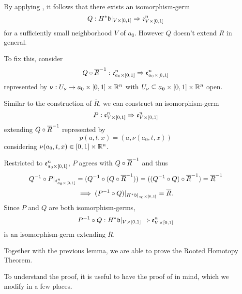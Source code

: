 \begin{myproof}
    By applying ,
    it follows that there exists an isomorphism-germ
    \[ Q: H^*\mathfrak{b}\vert_{V \times{} [0, 1]} \Rightarrow{} \mathfrak{e}^{n}_{V \times{} [0, 1]} \]
    for a sufficiently small neighborhood $V$ of $a_0$.
    However $Q$ doesn't extend $R$ in general.

    To fix this, consider
    \[ Q \circ \overline{R}^{-1}: \mathfrak{e}^{n}_{a_0 \times{} [0, 1]} \Rightarrow{} \mathfrak{e}^{n}_{a_0 \times{} [0, 1]} \]
    represented by $\nu: U_\nu \to a_0 \times{} [0, 1] \times \mathbb{R}^n$
    with $U_\nu \subseteq{} a_0 \times{} [0, 1] \times \mathbb{R}^n$ open.

    Similar to the construction of $\overline{R}$, we can construct an isomorphism-germ
    \[ P: \mathfrak{e}^{n}_{V \times{} [0, 1]} \Rightarrow{} \mathfrak{e}^{n}_{V \times{} [0, 1]} \]
    extending $Q \circ \overline{R}^{-1}$ represented by
    \[ p(a, t, x) = (a, \nu(a_0, t, x)) \]
    considering $\nu(a_0, t, x) \in [0, 1] \times \mathbb{R}^n$.

    Restricted to $\mathfrak{e}^{n}_{a_0 \times{} [0, 1]}$, $P$ agrees with $Q \circ \overline{R}^{-1}$ and thus
    \[
        Q^{-1} \circ P\vert_{\mathfrak{e}^{n}_{a_0 \times{} [0, 1]}}
        = (Q^{-1} \circ (Q \circ \overline{R}^{-1}))
        = ((Q^{-1} \circ Q) \circ \overline{R}^{-1})
        = \overline{R}^{-1}
    \]
    \[ \implies (P^{-1} \circ Q)\vert_{H^*\mathfrak{b}\vert_{a_0 \times{} [0, 1]}} = \overline{R}. \]
    Since $P$ and $Q$ are both isomorphism-germs,
    \[ P^{-1} \circ Q: H^*\mathfrak{b}\vert_{V \times{} [0, 1]} \Rightarrow{} \mathfrak{e}^{n}_{V \times{} [0, 1]} \]
    is an isomorphism-germ extending $\overline{R}$.
\end{myproof}

\begin{myparagraph}
    Together with the previous lemma,
    we are able to prove the Rooted Homotopy Theorem.

    To understand the proof,
    it is useful to have the proof of  in mind,
    which we modify in a few places.
\end{myparagraph}

